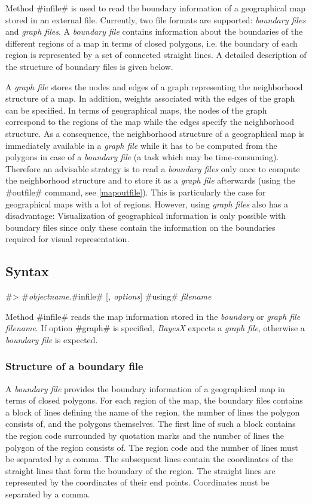 Method #infile# is used to read the boundary information of a
geographical map stored in an external file. Currently, two file
formats are supported: {\em boundary files} and {\em graph files}.
A {\em boundary file} contains information about the boundaries of
the different regions of a map in terms of closed polygons, i.e.
the boundary of each region is represented by a set of connected
straight lines. A detailed description of the structure of
boundary files is given below.

A {\em graph file} stores the nodes and edges of a graph
representing the neighborhood structure of a map. In addition,
weights associated with the edges of the graph can be specified.
In terms of geographical maps, the nodes of the graph correspond
to the regions of the map while the edges specify the neighborhood
structure. As a consequence, the neighborhood structure of a
geographical map is immediately available in a {\em graph file}
while it has to be computed from the polygons in case of a {\em
boundary file} (a task which may be time-consuming). Therefore an
advisable strategy is to read a {\em boundary files} only once to
compute the neighborhood structure and to store it as a {\em graph
file} afterwards (using the #outfile# command, see
\autoref{mapoutfile}). This is particularly the case for
geographical maps with a lot of regions. However, using {\em graph
files} also has a disadvantage: Visualization of geographical
information is only possible with boundary files since only these
contain the information on the boundaries required for visual
representation.

\subsection{Syntax}

#> #{\em objectname}.#infile# [{\em , options}] #using# {\em filename}

Method #infile# reads the map information stored in the {\em
boundary} or {\em graph file} {\em filename}. If option #graph# is
specified, {\em BayesX} expects a {\em graph file}, otherwise a
{\em boundary file} is expected.

\subsubsection*{Structure of a boundary file}

A {\em boundary file} provides the boundary information of a
geographical map in terms of closed polygons. For each region of
the map, the boundary files contains a block of lines defining the
name of the region, the number of lines the polygon consists of,
and the polygons themselves. The first line of such a block
contains the region code surrounded by quotation marks and the
number of lines the polygon of the region consists of. The region
code and the number of lines must be separated by a comma. The
subsequent lines contain the coordinates of the straight lines
that form the boundary of the region. The straight lines are
represented by the coordinates of their end points. Coordinates
must be separated by a comma.

